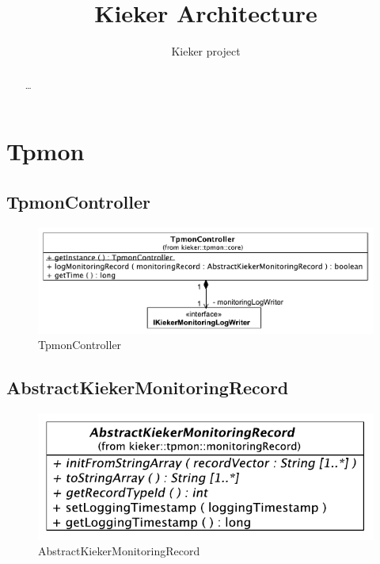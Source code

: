 \documentclass[12pt,journal,a4paper,twocolumn,final,oneside]{IEEEtran}%
\begin{document}
%

\setcounter{page}{1}

\title{%
Kieker Architecture%
}

\author{%
Kieker project
}

\maketitle

\begin{abstract}\small
\ldots
\end{abstract}

\section{Tpmon}

\subsection{TpmonController}

\begin{figure}[h]\centering
\includegraphics[scale=0.55]{figures/model/kieker_TpmonController}%
\caption{TpmonController}
\end{figure}
 
\subsection{AbstractKiekerMonitoringRecord}

\begin{figure}[h]\centering
\includegraphics[scale=0.55]{figures/model/kieker_AbstractKiekerMonitoringRecord}%
\caption{AbstractKiekerMonitoringRecord}
\end{figure}
\end{document}
